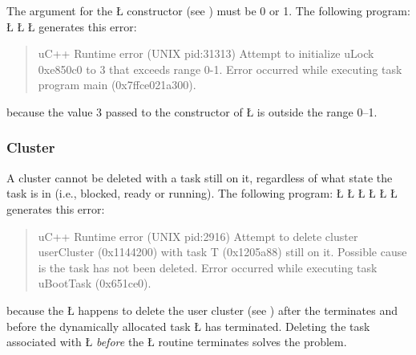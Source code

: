 \documentclass[openright,twoside]{report}
\begin{document}
The argument for the \LGinlinetrue\LGbegin\lgrinde\L{}\endlgrinde\LGend{} constructor (see ) must be 0 or 1.
The following program:
\LGinlinefalse\LGbegin\lgrinde
\L{}
\L{\LB{}}
\L{\LB{\}}}
\endlgrinde\LGend
generates this error:
\begin{quote}
\BGfont
uC++ Runtime error (UNIX pid:31313) Attempt to initialize uLock 0xe850c0 to 3 that exceeds range 0-1.
Error occurred while executing task program main (0x7ffce021a300).
\end{quote}
because the value 3 passed to the constructor of \LGinlinetrue\LGbegin\lgrinde\L{}\endlgrinde\LGend{} is outside the range 0--1.


\subsubsection{Cluster}

A cluster cannot be deleted with a task still on it, regardless of what state the task is in (i.e., blocked, ready or running).
The following program:
\LGinlinefalse\LGbegin\lgrinde
\L{}
\L{\LB{}}
\L{\LB{\};}}
\L{}
\L{\LB{}}
\L{\LB{\}}}
\endlgrinde\LGend
generates this error:
\begin{quote}
\BGfont
uC++ Runtime error (UNIX pid:2916) Attempt to delete cluster userCluster (0x1144200) with task T (0x1205a88) still on it.
Possible cause is the task has not been deleted.
Error occurred while executing task uBootTask (0x651ce0).
\end{quote}
because the \LGinlinetrue\LGbegin\lgrinde\L{}\endlgrinde\LGend{} happens to delete the user cluster (see ) after the  terminates and before the dynamically allocated task \LGinlinetrue\LGbegin\lgrinde\L{}\endlgrinde\LGend{} has terminated.
Deleting the task associated with \LGinlinetrue\LGbegin\lgrinde\L{}\endlgrinde\LGend{} \emph{before} the \LGinlinetrue\LGbegin\lgrinde\L{}\endlgrinde\LGend{} routine terminates solves the problem.
\end{document}
